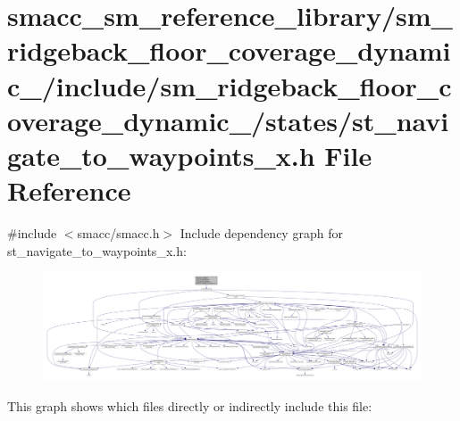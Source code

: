 \hypertarget{sm__ridgeback__floor__coverage__dynamic__1_2include_2sm__ridgeback__floor__coverage__dynamic__1_3fed5e8ad7de3a7070c001932f8560e3}{}\section{smacc\+\_\+sm\+\_\+reference\+\_\+library/sm\+\_\+ridgeback\+\_\+floor\+\_\+coverage\+\_\+dynamic\+\_/include/sm\+\_\+ridgeback\+\_\+floor\+\_\+coverage\+\_\+dynamic\+\_/states/st\+\_\+navigate\+\_\+to\+\_\+waypoints\+\_\+x.h File Reference}
\label{sm__ridgeback__floor__coverage__dynamic__1_2include_2sm__ridgeback__floor__coverage__dynamic__1_3fed5e8ad7de3a7070c001932f8560e3}
{\ttfamily \#include $<$smacc/smacc.\+h$>$}\newline
Include dependency graph for st\+\_\+navigate\+\_\+to\+\_\+waypoints\+\_\+x.\+h\+:
\nopagebreak
\begin{figure}[H]
\begin{center}
\leavevmode
\includegraphics[width=350pt]{sm__ridgeback__floor__coverage__dynamic__1_2include_2sm__ridgeback__floor__coverage__dynamic__1_c7cef07ce2ba148b1151d7cc21e3eb59}
\end{center}
\end{figure}
This graph shows which files directly or indirectly include this file\+:
\nopagebreak
